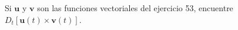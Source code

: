 \item Si $\mathbf{u}$ y $\mathbf{v}$ son las funciones vectoriales del ejercicio 53, encuentre $D_t[\mathbf{u}(t) \times \mathbf{v}(t)]$.
